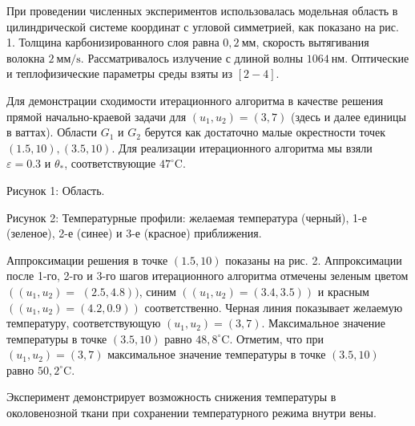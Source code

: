 При проведении численных экспериментов использовалась модельная область в
цилиндрической системе координат с угловой симметрией, как показано на рис. 1.
Толщина карбонизированного слоя равна
$0,2 \mathrm{~мм}$, скорость вытягивания волокна
$2 \mathrm{~мм}/\mathrm{s}$. Рассматривалось излучение с длиной волны
$1064 \mathrm{~нм}$.
Оптические и теплофизические параметры среды взяты из $[2-4]$.


Для демонстрации сходимости итерационного алгоритма в качестве
решения прямой начально-краевой задачи для $\left(u_{1}, u_{2}\right)=( 3,7)$
(здесь и далее единицы в ваттах).
Области $G_{1}$ и $G_{2}$
берутся как достаточно малые окрестности точек $(1.5,10),(3.5,10)$.
Для реализации итерационного алгоритма мы взяли $\varepsilon=0.3$ и $\theta_{*}$,
 соответствующие $47^{\circ} \mathrm{C}$.



Рисунок 1: Область.


Рисунок 2: Температурные профили: желаемая температура (черный),
1-е (зеленое), 2-е (синее) и 3-е (красное) приближения.

Аппроксимации решения в точке $(1.5,10)$ показаны на рис. 2.
Аппроксимации после 1-го, 2-го и 3-го шагов итерационного алгоритма отмечены зеленым
цветом
$\left(\left(u_{1 }, u_{2}\right)=\right.$ $(2.5,4.8))$,
синим  $\left(\left(u_{1}, u_{2}\right)=(3.4,3.5)\right)$
и красным $\left(\left(u_{1}, u_{2}\right)=(4.2,0.9)\right)$ соответственно.
Черная линия показывает желаемую температуру, соответствующую
$\left(u_{1}, u_{2}\right)=(3,7)$.
Максимальное значение температуры в точке $(3.5,10)$ равно $48,8^{\circ}\mathrm{C}$.
Отметим, что при $\left(u_{1}, u_{2}\right)=(3,7)$ максимальное значение
температуры в точке $(3.5,10)$ равно $50,2^{ \circ} \mathrm{C}$.

Эксперимент демонстрирует возможность снижения температуры в
околовенозной ткани при сохранении температурного режима внутри вены.

